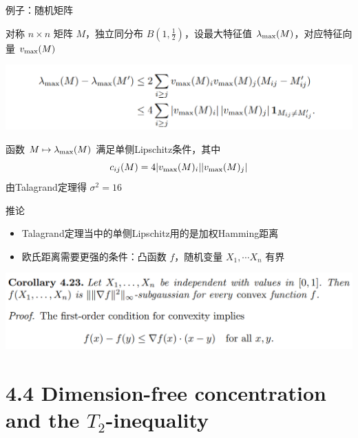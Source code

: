 \documentclass{beamer}
\begin{document}
\begin{frame}{例子：随机矩阵}

对称 $n\times n$ 矩阵 $M$，独立同分布 $B(1, \frac{1}{2})$，设最大特征值 $\lambda_{\rm max}(M)$，对应特征向量 $v_{\rm max}(M)$

\begin{center}
    \includegraphics[width=1.0\textwidth, frame]{figures/4-22-eg.png}
\end{center}

函数 $M\mapsto \lambda_{\rm max}(M)$ 满足单侧Lipschitz条件，其中
$$c_{ij}(M) = 4|v_{\rm max}(M)_i||v_{\rm max}(M)_j|$$
由Talagrand定理得 $\sigma^2=16$ 

\end{frame}

\begin{frame}{推论}

\begin{itemize}
    \item Talagrand定理当中的单侧Lipschitz用的是加权Hamming距离
    \item 欧氏距离需要更强的条件：凸函数 $f$，随机变量 $X_1, \cdots X_n$ 有界
\end{itemize}

\begin{center}
    \includegraphics[width=1.0\textwidth, frame]{figures/4-23-corol.png}
\end{center}

\end{frame}




\section{4.4 Dimension-free concentration and the \texorpdfstring{$T_2$}{2}-inequality}
\end{document}
